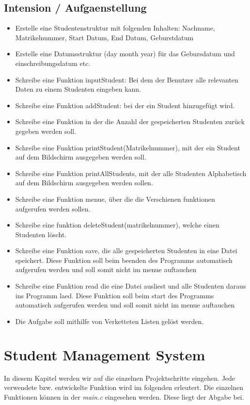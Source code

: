\documentclass[a4paper, 11pt, oneside]{book} %
\begin{document}
\section{Intension / Aufgaenstellung} \label{aufgabe}
\begin{itemize}
\item Erstelle eine Studentenstruktur mit folgenden Inhalten: Nachname, Matrikelnummer, Start Datum, End Datum, Geburstdatum
\item Erstelle eine Datumsstruktur (day month year) für das Gebursdatum und einschreibungsdatum etc.
\item Schreibe eine Funktion inputStudent: Bei dem der Benutzer alle relevanten Daten zu einem Studenten eingeben kann.
\item Schreibe eine Funktion addStudent: bei der ein Student hinzugefügt wird.
\item Schreibe eine Funktion in der die Anzahl der gespeicherten Studenten zurück gegeben werden soll.
\item Schreibe eine Funktion printStudent(Matrikelnummer), mit der ein Student auf dem Bildschirm ausgegeben werden soll.
\item Schreibe eine Funktion printAllStudents, mit der alle Studenten Alphabetisch auf dem Bildschirm ausgegeben werden sollen.
\item Schreibe eine Funktion menue, über die die Verschienen funktionen aufgerufen werden sollen.
\item Schreibe eine funktion deleteStudent(matrikelnummer), welche einen Studenten löscht.
\item Schreibe eine Funktion save, die alle gespeicherten Studenten in eine Datei speichert. Diese Funktion soll beim beenden des Programms automatisch aufgerufen werden und soll somit nicht im menue auftauchen
\item Schreibe eine Funktion read die eine Datei ausliest und alle Studenten daraus ins Programm laed. Diese Funktion soll beim start des Programms automatisch aufgerufen werden und soll somit nicht im menue auftauchen
\item Die Aufgabe soll mithilfe von Verketteten Listen gelöst werden.

\end{itemize}

\chapter{Student Management System} 
In diesem  Kapitel werden wir auf die einzelnen Projektschritte eingehen. Jede verwendete bzw. entwickelte Funktion wird im folgenden erleutert. Die einzelnen Funktionen können in der \textit{main.c} eingesehen werden. Diese liegt der Abgabe bei. \newline
\end{document}
